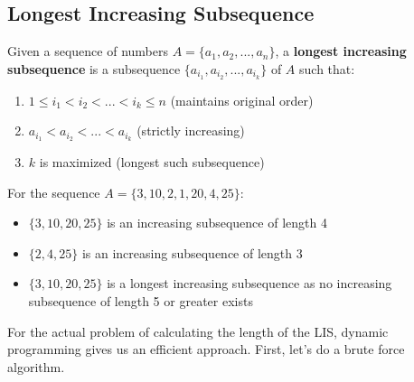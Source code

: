 \documentclass{article}
\begin{document}
  \subsection{Longest Increasing Subsequence}

    \begin{definition}
      Given a sequence of numbers $A = \{a_1, a_2, ..., a_n\}$, a \textbf{longest increasing subsequence} is a subsequence $\{a_{i_1}, a_{i_2}, ..., a_{i_k}\}$ of $A$ such that:
      \begin{enumerate}
        \item $1 \leq i_1 < i_2 < ... < i_k \leq n$ (maintains original order)
        \item $a_{i_1} < a_{i_2} < ... < a_{i_k}$ (strictly increasing)
        \item $k$ is maximized (longest such subsequence)
      \end{enumerate}
    \end{definition}

    \begin{example}
      For the sequence $A = \{3, 10, 2, 1, 20, 4, 25\}$:
      \begin{itemize}
        \item $\{3, 10, 20, 25\}$ is an increasing subsequence of length 4
        \item $\{2, 4, 25\}$ is an increasing subsequence of length 3
        \item $\{3, 10, 20, 25\}$ is a longest increasing subsequence as no increasing subsequence of length 5 or greater exists
      \end{itemize}
    \end{example}

    For the actual problem of calculating the length of the LIS, dynamic programming gives us an efficient approach. First, let's do a brute force algorithm. 
\end{document}
